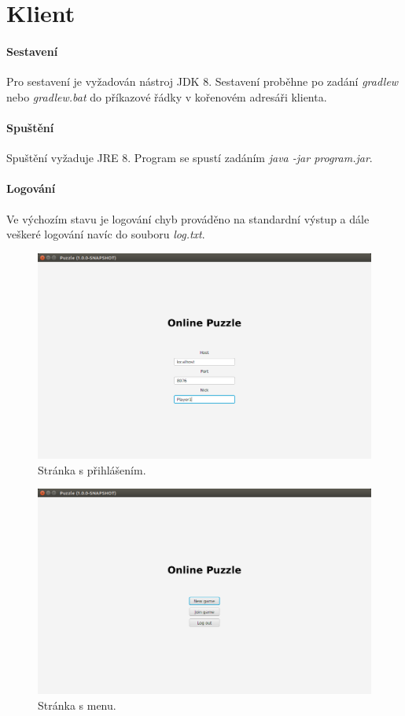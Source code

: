 \documentclass[12pt, a4paper]{report}
\begin{document}
\section{Klient}

\paragraph{Sestavení}
Pro sestavení je vyžadován nástroj JDK 8.
Sestavení proběhne po zadání \emph{gradlew} nebo \emph{gradlew.bat} do příkazové řádky v kořenovém adresáři klienta.

\paragraph{Spuštění}
Spuštění vyžaduje JRE 8. Program se spustí zadáním \emph{java -jar program.jar}.

\paragraph{Logování}
Ve výchozím stavu je logování chyb prováděno na standardní výstup a dále veškeré logování navíc do souboru \emph{log.txt}.

\begin{figure}[H]
	\centering
	\includegraphics[width=1\linewidth]{img-scr-login}
	\caption{Stránka s přihlášením.}
\end{figure}

\begin{figure}[H]
	\centering
	\includegraphics[width=1\linewidth]{img-scr-menu}
	\caption{Stránka s menu.}
\end{figure}
\end{document}
